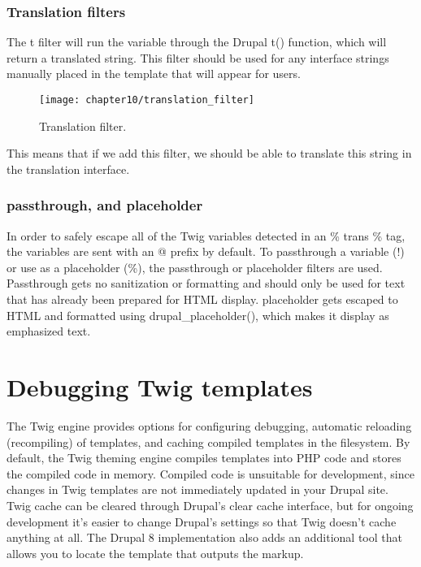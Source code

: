 \subsubsection{Translation filters}

The t filter will run the variable through the Drupal t() function, which will return a translated string. This filter should be used for any interface strings manually placed in the template that will appear for users.

\begin{figure}[H]
	\centering
	\texttt{[image: chapter10/translation\_filter]}
	\caption{Translation filter.}
	\label{fig:translation_filter}
\end{figure}

This means that if we add this filter, we should be able to translate this string in the translation interface.

\subsubsection{passthrough, and placeholder}

In order to safely escape all of the Twig variables detected in an {\% trans \%} tag, the variables are sent with an @ prefix by default. To pass­through a variable (!) or use as a placeholder (\%), the passthrough or placeholder filters are used. Passthrough gets no sanitization or formatting and should only be used for text that has already been prepared for HTML display. placeholder gets escaped to HTML and formatted using drupal\_placeholder(), which makes it display as emphasized text.



\section{Debugging Twig templates}

The Twig engine provides options for configuring debugging, automatic reloading (recompiling) of templates, and caching compiled templates in the filesystem. By default, the Twig theming engine compiles templates into PHP code and stores the compiled code in memory. Compiled code is unsuitable for development, since changes in Twig templates are not immediately updated in your Drupal site. Twig cache can be cleared through Drupal's clear cache interface, but for ongoing development it's easier to change Drupal's settings so that Twig doesn't cache anything at all.
The Drupal 8 implementation also adds an additional tool that allows you to locate the template that outputs the markup.

